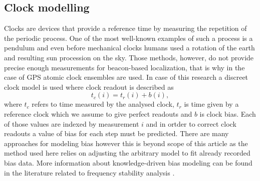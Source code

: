 \documentclass{article}
\begin{document}
\subsection{Clock modelling}
Clocks are devices that provide a reference time by measuring the repetition of the periodic process. One of the most well-known examples of such a process is a pendulum and even before
mechanical clocks humans used a rotation of the earth and resulting sun procession on the sky.
Those methods, however, do not provide precise enough measurements for beacon-based localization,
that is why in the case of GPS atomic clock ensembles are used.
In case of this research a discreet clock model is used where clock readout is described as 
\begin{equation}
	t_{c}(i) = t_{r}(i) + b(i),
\end{equation}
where $t_{c}$ refers to time measured by the analysed clock, $t_{r}$ is time given by a 
reference clock which we assume to give perfect readouts and $b$ is clock bias.
Each of those values are indexed by measurement $i$ and in ortder to correct clock readouts
a value of bias for each step must be predicted.
There are many approaches for modeling bias however this is beyond scope of this article
as the method used here relies on adjusting the arbitrary model to fit already recorded bias data.
More information about knowledge-driven bias modeling can be found in the literature related to
frequency stability analysis \cite{Riley2007}.

\end{document}
